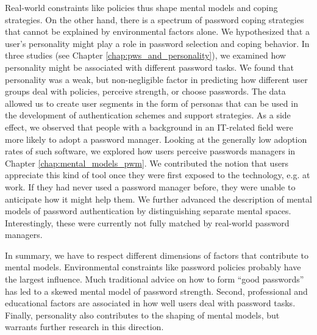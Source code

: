 Real-world constraints like policies thus shape mental models and coping strategies. On the other hand, there is a spectrum of password coping strategies that cannot be explained by environmental factors alone. We hypothesized that a user's personality might play a role in password selection and coping behavior. In three studies (see Chapter \ref{chap:pws_and_personality}), we examined how personality might be associated with different password tasks. We found that personality was a weak, but non-negligible factor in predicting how different user groups deal with policies, perceive strength, or choose passwords. The data allowed us to create user segments in the form of personas that can be used in the development of authentication schemes and support strategies. 
As a side effect, we observed that people with a background in an IT-related field were more likely to adopt a password manager. Looking at the generally low adoption rates of such software, we explored how users perceive passwords managers in Chapter \ref{chap:mental_models_pwm}. We contributed the notion that users appreciate this kind of tool once they were first exposed to the technology, e.g. at work. If they had never used a password manager before, they were unable to anticipate how it might help them. We further advanced the description of mental models of password authentication by distinguishing separate mental spaces. Interestingly, these were currently not fully matched by real-world password managers. 

In summary, we have to respect different dimensions of factors that contribute to mental models. Environmental constraints like password policies probably have the largest influence. Much traditional advice on how to form ``good passwords'' has led to a skewed mental model of password strength. Second, professional and educational factors are associated in how well users deal with password tasks. Finally, personality also contributes to the shaping of mental models, but warrants further research in this direction. %

